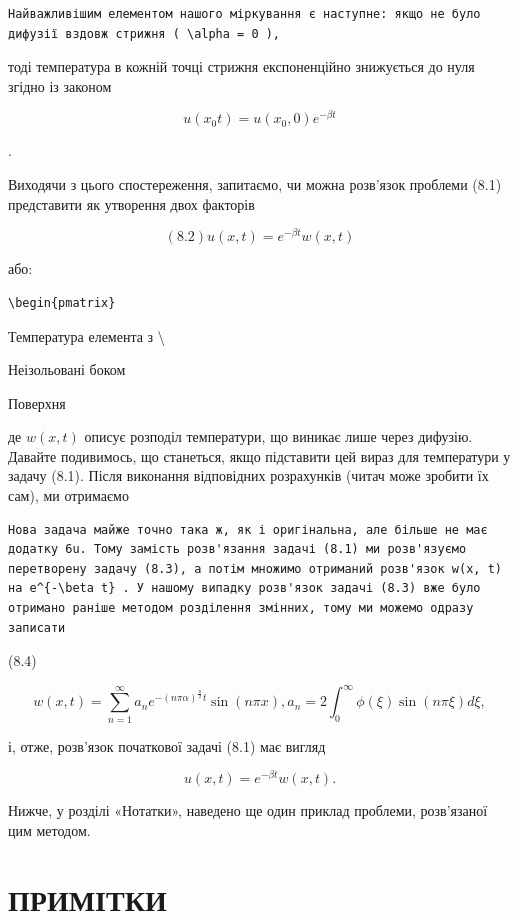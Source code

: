 \documentclass[
  ukrainian,
]{article}
\begin{document}
\begin{verbatim}
Найважливішим елементом нашого міркування є наступне: якщо не було дифузії вздовж стрижня ( \alpha = 0 ),
\end{verbatim}

тоді температура в кожній точці стрижня експоненційно знижується до нуля
згідно із законом

\[
u(x_0 t) = u(x_0, 0) e^{-\beta t}
\]

.

Виходячи з цього спостереження, запитаємо, чи можна розв'язок проблеми
(8.1) представити як утворення двох факторів

\[
(8.2) u(x, t) = e^{-\beta t}w(x, t)
\]

або:

\begin{verbatim}
\begin{pmatrix}
\end{verbatim}

Температура елемента з \textbackslash{}

Неізольовані боком

Поверхня

де \(w(x, t)\) описує розподіл температури, що виникає лише через
дифузію. Давайте подивимось, що станеться, якщо підставити цей вираз для
температури у задачу (8.1). Після виконання відповідних розрахунків
(читач може зробити їх сам), ми отримаємо

\begin{verbatim}
Нова задача майже точно така ж, як і оригінальна, але більше не має додатку 6u. Тому замість розв'язання задачі (8.1) ми розв'язуємо перетворену задачу (8.3), а потім множимо отриманий розв'язок w(x, t) на e^{-\beta t} . У нашому випадку розв'язок задачі (8.3) вже було отримано раніше методом розділення змінних, тому ми можемо одразу записати
\end{verbatim}

(8.4)

\[
w(x, t) = \sum_{n=1}^{\infty} a_n e^{-(n\pi\alpha)^{\frac{n}{2}}t} \sin(n\pi x),
a_n = 2 \int_0^{\infty} \phi(\xi) \sin(n\pi \xi) d\xi,
\]

і, отже, розв'язок початкової задачі (8.1) має вигляд

\[
u(x, t) = e^{-\beta t}w(x, t).
\]

Нижче, у розділі «Нотатки», наведено ще один приклад проблеми,
розв'язаної цим методом.

\section{ПРИМІТКИ}\label{ux43fux440ux438ux43cux456ux442ux43aux438}
\end{document}
